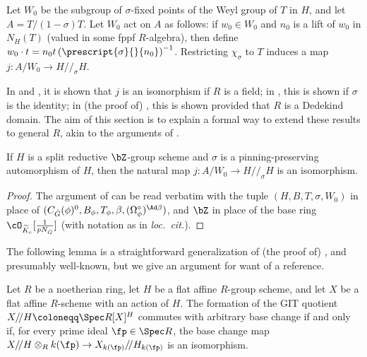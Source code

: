 Let $W_0$ be the subgroup of $\sigma$-fixed points of the Weyl group of $T$ in $H$, and let $A = T/(1 - \sigma)T$. Let $W_0$ act on $A$ as follows: if $w_0 \in W_0$ and $n_0$ is a lift of $w_0$ in $N_{H}(T)$ (valued in some fppf $R$-algebra), then define $w_0 \cdot t = n_0 t \left(\prescript{\sigma}{}{n_0}\right)^{-1}$. Restricting $\chi_{\sigma}$ to $T$ induces a map $j\colon A/W_0 \to H/\!/_\sigma H$.\smallskip

In \cite[Thm.\ 1]{Springer-twisted} and \cite[4.2.3]{Xiao-Zhu}, it is shown that $j$ is an isomorphism if $R$ is a field; in \cite[4.1]{Lee-adjoint}, this is shown if $\sigma$ is the identity; in (the proof of) \cite[6.6]{DHKM}, this is shown provided that $R$ is a Dedekind domain. The aim of this section is to explain a formal way to extend these results to general $R$, akin to the arguments of \cite{Lee-adjoint}.

\begin{prop}\label{prop:twisted-chevalley-split}
    If $H$ is a split reductive $\bZ$-group scheme and $\sigma$ is a pinning-preserving automorphism of $H$, then the natural map $j\colon A/W_0 \to H/\!/_{\sigma} H$ is an isomorphism.
\end{prop}

\begin{proof}
    The argument of \cite[6.6]{DHKM} can be read verbatim with the tuple $(H, B, T, \sigma, W_0)$ in place of $(C_{\hat{G}}(\phi)^0, B_{\phi}, T_{\phi}, \beta, (\Omega_{\phi}^\circ)^{\Ad \beta})$, and $\bZ$ in place of the base ring $\cO_{\widetilde{K}_e}[\frac{1}{pN_{\hat{G}}}]$ (with notation as in \textit{loc.\ cit.}).
\end{proof}

The following lemma is a straightforward generalization of (the proof of) \cite[4.2]{Lee-adjoint}, and presumably well-known, but we give an argument for want of a reference.

\begin{lemma}\label{lemma:enough-to-check-GIT-on-primes}
    Let $R$ be a noetherian ring, let $H$ be a flat affine $R$-group scheme, and let $X$ be a flat affine $R$-scheme with an action of $H$. The formation of the GIT quotient $X/\!/H \coloneqq \Spec R[X]^H$ commutes with arbitrary base change if and only if, for every prime ideal $\fp \in \Spec R$, the base change map $X/\!/H \otimes_R k(\fp) \to X_{k(\fp)}/\!/H_{k(\fp)}$ is an isomorphism.
\end{lemma}

